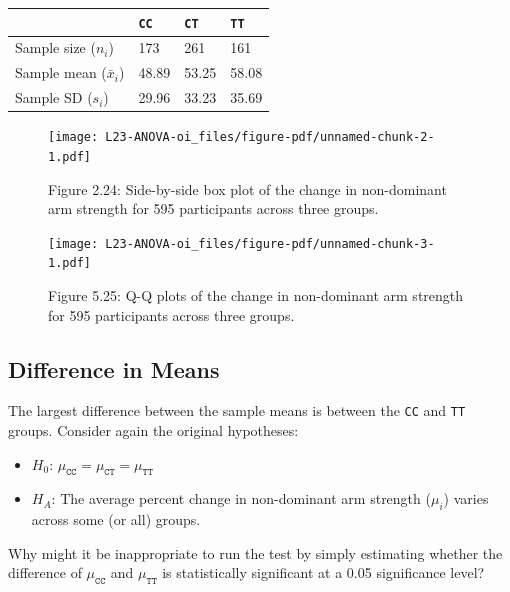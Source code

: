\documentclass[
  letterpaper,
  DIV=11,
  numbers=noendperiod,
  oneside]{scrreprt}
\providecommand{\tightlist}{%
  \setlength{\itemsep}{0pt}\setlength{\parskip}{0pt}}\usepackage{longtable,booktabs,array}
\begin{document}
\begin{longtable}[]{@{}llll@{}}
\toprule\noalign{}
& \texttt{CC} & \texttt{CT} & \texttt{TT} \\
\midrule\noalign{}
\endhead
\bottomrule\noalign{}
\endlastfoot
Sample size (\(n_i\)) & 173 & 261 & 161 \\
Sample mean (\(\bar{x}_i\)) & 48.89 & 53.25 & 58.08 \\
Sample SD (\(s_i\)) & 29.96 & 33.23 & 35.69 \\
\end{longtable}

\begin{figure}

{\centering \texttt{[image: L23-ANOVA-oi\_files/figure-pdf/unnamed-chunk-2-1.pdf]}

}

\caption{Figure 2.24: Side-by-side box plot of the change in
non-dominant arm strength for 595 participants across three groups.}

\end{figure}

\begin{figure}

{\centering \texttt{[image: L23-ANOVA-oi\_files/figure-pdf/unnamed-chunk-3-1.pdf]}

}

\caption{Figure 5.25: Q-Q plots of the change in non-dominant arm
strength for 595 participants across three groups.}

\end{figure}

\hypertarget{difference-in-means}{%
\subsection{Difference in Means}\label{difference-in-means}}

The largest difference between the sample means is between the
\texttt{CC} and \texttt{TT} groups. Consider again the original
hypotheses:

\begin{itemize}
\tightlist
\item
  \(H_0\): \(\mu_{\texttt{CC}} = \mu_{\texttt{CT}} = \mu_{\texttt{TT}}\)
\item
  \(H_A\): The average percent change in non-dominant arm strength
  (\(\mu_i\)) varies across some (or all) groups.
\end{itemize}

Why might it be inappropriate to run the test by simply estimating
whether the difference of \(\mu_{\texttt{CC}}\) and
\(\mu_{\texttt{TT}}\) is statistically significant at a 0.05
significance level?
\end{document}
